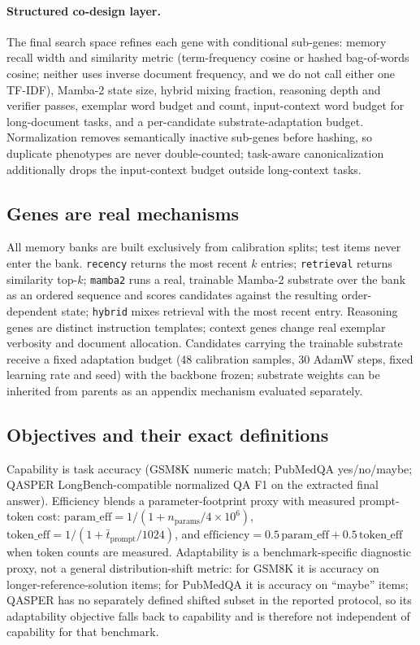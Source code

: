 \documentclass[11pt]{article}
\begin{document}
\paragraph{Structured co-design layer.} The final search space refines each
gene with conditional sub-genes: memory recall width and similarity metric
(term-frequency cosine or hashed bag-of-words cosine; neither uses inverse
document frequency, and we do not call either one TF-IDF), Mamba-2 state
size, hybrid mixing fraction, reasoning depth and verifier passes, exemplar
word budget and count, input-context word budget for long-document tasks,
and a per-candidate substrate-adaptation budget. Normalization removes
semantically inactive sub-genes before hashing, so duplicate phenotypes are
never double-counted; task-aware canonicalization additionally drops the
input-context budget outside long-context tasks.

\subsection{Genes are real mechanisms}

All memory banks are built exclusively from calibration splits; test items
never enter the bank. \texttt{recency} returns the most recent $k$ entries;
\texttt{retrieval} returns similarity top-$k$; \texttt{mamba2} runs a real,
trainable Mamba-2 substrate over the bank as an ordered sequence and scores
candidates against the resulting order-dependent state; \texttt{hybrid}
mixes retrieval with the most recent entry. Reasoning genes are distinct
instruction templates; context genes change real exemplar verbosity and
document allocation. Candidates carrying the trainable substrate receive a
fixed adaptation budget (48 calibration samples, 30 AdamW steps, fixed
learning rate and seed) with the backbone frozen; substrate weights can be
inherited from parents as an appendix mechanism evaluated separately.

\subsection{Objectives and their exact definitions}

Capability is task accuracy (GSM8K numeric match; PubMedQA yes/no/maybe;
QASPER LongBench-compatible normalized QA F1 on the extracted final answer).
Efficiency blends a parameter-footprint proxy with measured prompt-token
cost: $\mathrm{param\_eff} = 1/(1 + n_{\text{params}} / 4\times10^{6})$,
$\mathrm{token\_eff} = 1/(1 + \bar{t}_{\text{prompt}} / 1024)$, and
$\mathrm{efficiency} = 0.5\,\mathrm{param\_eff} + 0.5\,\mathrm{token\_eff}$
when token counts are measured. Adaptability is a benchmark-specific
diagnostic proxy, not a general distribution-shift metric: for GSM8K it is
accuracy on longer-reference-solution items; for PubMedQA it is accuracy on
``maybe'' items; QASPER has no separately defined shifted subset in the
reported protocol, so its adaptability objective falls back to capability
and is therefore not independent of capability for that benchmark.
\end{document}

